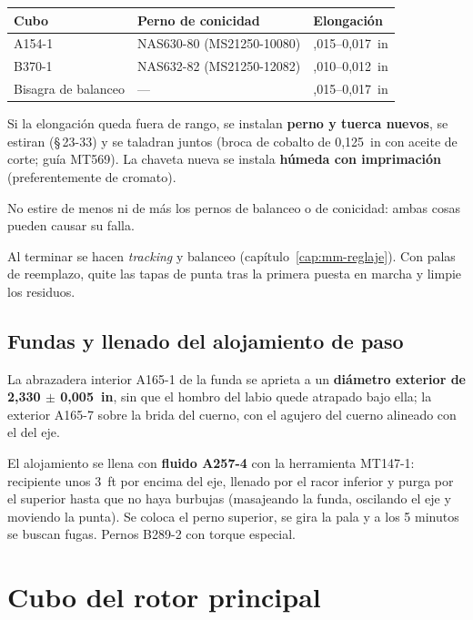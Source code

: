 \begin{center}
\begin{tabularx}{\linewidth}{@{}>{\raggedright\arraybackslash}X>{\raggedright\arraybackslash}X>{\raggedright\arraybackslash}X@{}}
\toprule
Cubo & Perno de conicidad & Elongación \\
\midrule
A154-1 & NAS630-80 (MS21250-10080) & 0,015--0,017~in \\
B370-1 & NAS632-82 (MS21250-12082) & 0,010--0,012~in \\
Bisagra de balanceo & --- & 0,015--0,017~in \\
\bottomrule
\end{tabularx}
\end{center}

Si la elongación queda fuera de rango, se instalan \textbf{perno y tuerca nuevos}, se estiran (\S\,23-33) y se taladran juntos (broca de cobalto de 0,125~in con aceite de corte; guía MT569). La chaveta nueva se instala \textbf{húmeda con imprimación} (preferentemente de cromato).

\begin{advertencia}
No estire de menos ni de más los pernos de balanceo o de conicidad: ambas cosas pueden causar su falla.
\end{advertencia}

Al terminar se hacen \emph{tracking} y balanceo (capítulo~\ref{cap:mm-reglaje}). Con palas de reemplazo, quite las tapas de punta tras la primera puesta en marcha y limpie los residuos.

\subsection{Fundas y llenado del alojamiento de paso}

La abrazadera interior A165-1 de la funda se aprieta a un \textbf{diámetro exterior de 2,330 $\pm$ 0,005~in}, sin que el hombro del labio quede atrapado bajo ella; la exterior A165-7 sobre la brida del cuerno, con el agujero del cuerno alineado con el del eje.

El alojamiento se llena con \textbf{fluido A257-4} con la herramienta MT147-1: recipiente unos 3~ft por encima del eje, llenado por el racor inferior y purga por el superior hasta que no haya burbujas (masajeando la funda, oscilando el eje y moviendo la punta). Se coloca el perno superior, se gira la pala y a los 5 minutos se buscan fugas. Pernos B289-2 con torque especial.

\section{Cubo del rotor principal}

